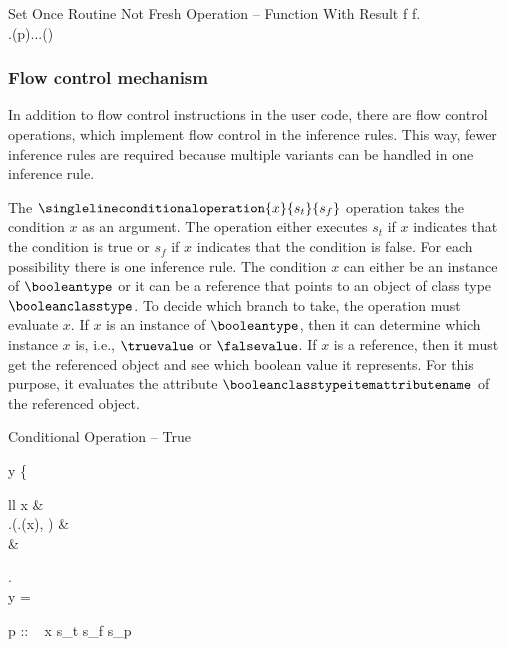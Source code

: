 \inferencerule
	{Set Once Routine Not Fresh Operation -- Function With Result}
	{
		f \in \functiontype \wedge f.\isonceroutinefeature \\
		\state.\environmentsfeature(p).\topfeature.\namesfeature.\containsfeature(\resultentityname) \\
	}
	{}
	{}
 
\subsubsection{Flow control mechanism}
In addition to flow control instructions in the user code, there are flow control operations, which implement flow control in the inference rules. This way, fewer inference rules are required because multiple variants can be handled in one inference rule.

The $\singlelineconditionaloperation{x}{s_{t}}{s_{f}}$ operation takes the condition $x$ as an argument. The operation either executes $s_{t}$ if $x$ indicates that the condition is true or $s_{f}$ if $x$ indicates that the condition is false. For each possibility there is one inference rule. The condition $x$ can either be an instance of $\booleantype$ or it can be a reference that points to an object of class type $\booleanclasstype$. To decide which branch to take, the operation must evaluate $x$. If $x$ is an instance of $\booleantype$, then it can determine which instance $x$ is, i.e., $\truevalue$ or $\falsevalue$. If $x$ is a reference, then it must get the referenced object and see which boolean value it represents. For this purpose, it evaluates the attribute $\booleanclasstypeitemattributename$ of the referenced object.

\singlelineinferencerule
	{Conditional Operation -- True}
	{
		y \mathematicaldefinition 
			\left\{
				\begin{array}{ll}
					x &  \\
					\state.\attributevaluefeature(\state.(x), \booleanclasstypeitemattributename) &  \\
					\falsevalue & \otherwisecondition
				\end{array}
			\right. \\
		y = \truevalue
	}
	{
		\configuration
			{
				p :: \ \singlelineconditionaloperation
					{x}
					{s_{t}}
					{s_{f}} \statementseparator
				s_{p}
			}
			{\state}
	}
	{}

